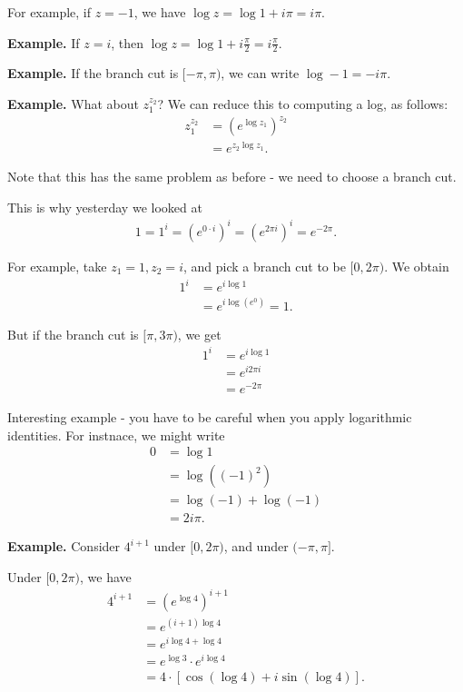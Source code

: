 \documentclass{article}
\begin{document}
For example, if $z = -1$, we have $\log z = \log 1 + i \pi = i \pi$.

{\bf Example.} If $z = i$, then $\log z = \log 1 + i \frac{\pi}{2} = i \frac{\pi}{2}$.

{\bf Example.} If the branch cut is $[- \pi, \pi)$, we can write $\log -1 = - i \pi$.

{\bf Example.} What about $z_1^{z_2}$?  We can reduce this to computing a log, as follows:
\begin{align*}
  z_1^{z_2} &= (e^{\log z_1})^{z_2} \\
  &= e^{z_2 \log z_1}.
\end{align*}

Note that this has the same problem as before - we need to choose a branch cut.

This is why yesterday we looked at
\begin{align*}
  1 = 1^i = (e^{0 \cdot i})^i = (e^{2 \pi i})^i = e^{- 2 \pi}.
\end{align*}

For example, take $z_1 = 1, z_2 = i$, and pick a branch cut to be $[0, 2 \pi)$.  We obtain
\begin{align*}
  1^i &= e^{i \log 1} \\
  &= e^{i \log (e^0)} = 1.
\end{align*}

But if the branch cut is $[\pi, 3 \pi)$, we get
\begin{align*}
  1^i &= e^{i \log 1} \\
  &= e^{i 2\pi i} \\
  &= e^{- 2 \pi}
\end{align*}

Interesting example - you have to be careful when you apply logarithmic identities.  For instnace, we might write
\begin{align*}
  0 &= \log 1  \\
  &= \log( \left( -1 \right)^2) \\
  &= \log(-1) + \log(-1) \\
  &= 2i \pi.
\end{align*}

{\bf Example.} Consider $4^{i+1}$ under $[0, 2\pi)$, and under $(- \pi, \pi]$.


Under $[0, 2\pi)$, we have
\begin{align*}
  4^{i+1} &= (e^{\log 4})^{i+1} \\
  &= e^{(i+1) \log 4} \\
  &= e^{i \log 4 + \log 4} \\
  &= e^{\log 3} \cdot e^{i \log 4} \\
  &= 4 \cdot [\cos(\log 4) + i \sin (\log 4)].
\end{align*}
\end{document}
